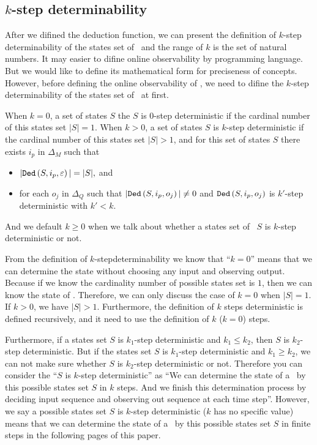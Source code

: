 \subsection{$k$-step determinability}
After we difined the deduction function, we can present the definition of $k$-step determinability of the states set of \BCNs\ and the range of $k$ is the set of natural numbers. It may easier to difine online observability by programming language. But we would like to define its mathematical form for preciseness of concepts. However, before defining the online observability of \BCNs, we need to difine the $k$-step determinability of the states set of \BCNs\ at first.
\begin{definition} 
When $k=0$, a set of states $S$ the $S$ is $0$-step deterministic if the cardinal number of this states set $|S|=1$. When $k>0$, a set of states $S$ is $k$-step deterministic
 if the cardinal number of this states set $|S|>1$, and for this set of states $S$ there exists $i_p$ in $\Delta_M$ such that
 \begin{itemize}
 \item  $|{\tt Ded}\left(S,i_p,\varepsilon\right)|=|S|, $ and 
 \item  for each $o_j$ in $\Delta_Q$ such that $|{\tt Ded}\left(S,i_p,o_j\right)|\neq 0$ and ${\tt Ded}\left(S,i_p,o_j\right)$ is $k'$-step deterministic with  ${k'}<k$.
 \end{itemize}
 And we default $k\ge0$ when we talk about whether a states set of \BCNs\ $S$ is $k$-step deterministic or not.
\end{definition}

From the definition of {\em$k$}-stepdeterminability we know that ``$k=0$'' means that we can determine the state without choosing any input and observing output. Because if we know the cardinality number of possible states set is $1$, then we can know the state of \BCNs. Therefore, we can only discuss the case of $k=0$ when $|S|=1$. If $k>0$, we have $|S|>1$. Furthermore, the definition of $k$ steps deterministic is defined recursively, and it need to use the definition of $k$ ($k=0$) steps. 

Furthermore, if a states set $S$ is $k_1$-step deterministic and $k_1\leq k_2$, then $S$ is $k_2$-step deterministic. But if the states set $S$ is $k_1$-step deterministic and $k_1\geq k_2$, we can not make sure whether $S$ is $k_2$-step deterministic or not. Therefore you can consider the ``$S$ is $k$-step deterministic'' as ``We can determine the state of a \BCN\ by this possible states set $S$ in $k$ steps. And we finish this determination process by deciding input sequence and observing out sequence at each time step''. However, we say a possible states set $S$ is $k$-step deterministic ($k$ has no specific value) means that we can determine the state of a \BCN\ by this possible states set $S$ in finite steps in the following pages of this paper.
